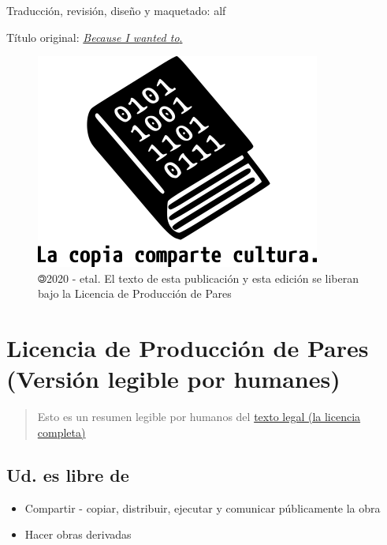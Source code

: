 \documentclass[
]{book}
\providecommand{\tightlist}{%
  \setlength{\itemsep}{0pt}\setlength{\parskip}{0pt}}
\begin{document}
Traducción, revisión, diseño y maquetado: alf

Título original: \href{https://theanarchistlibrary.org/library/max-res-kaneko-fumiko-because-i-wanted-to}{\emph{Because I wanted to}.}

\begin{figure}
\centering
\includegraphics{images/lccc.png}
\caption{🄯2020 - etal. El texto de esta publicación y esta edición se liberan bajo la Licencia de
Producción de Pares}
\end{figure}

\hypertarget{licencia-de-producciuxf3n-de-pares-versiuxf3n-legible-por-humanes}{%
\chapter*{Licencia de Producción de Pares (Versión legible por humanes)}\label{licencia-de-producciuxf3n-de-pares-versiuxf3n-legible-por-humanes}}

\begin{quote}
Esto es un resumen legible por humanos del \href{http://endefensadelsl.org/ppl_es.html}{texto legal (la licencia
completa)}
\end{quote}

\hypertarget{ud.-es-libre-de}{%
\section*{Ud. es libre de}\label{ud.-es-libre-de}}

\begin{itemize}
\tightlist
\item
  Compartir - copiar, distribuir, ejecutar y comunicar públicamente la obra
\item
  Hacer obras derivadas
\end{itemize}
\end{document}
